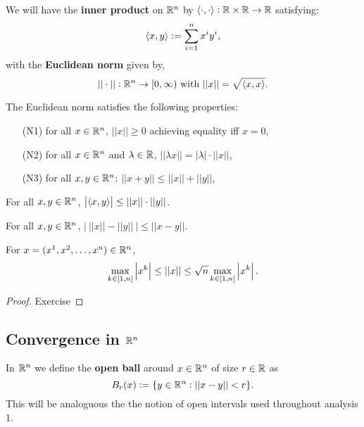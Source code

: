 \documentclass[../Year2.tex]{subfiles}
\begin{document}
\begin{definition}
    We will have the \textbf{inner product} on $\mathbb{R}^n$ by $\left\langle \cdot,\cdot \right\rangle:\mathbb{R}\times\mathbb{R}\rightarrow\mathbb{R}$ satisfying: 
    \[
        \left\langle x,y \right\rangle := \sum_{i=1}^n x^i y^i \text{\textcolor{black}{,}}
    \] with the \textbf{Euclidean norm} given by, \[
        ||\cdot||:\RR^n\rightarrow[0,\infty) \ \black{with } ||x||=\sqrt{\abr{x,x}}\black{.}
    \]
\end{definition}

\vspace{-20pt}

\begin{proposition}
    The Euclidean norm satisfies the following properties: \begin{enumerate}
        \item[(N1)] for all $x\in\mathbb{R}^n$, $||x||\geq 0$ achieving equality iff $x=0$,
        \item[(N2)] for all $x\in\mathbb{R}^n$ and $\lambda\in\mathbb{R}$, $||\lambda x|| = |\lambda|\cdot||x||$,
        \item[(N3)] for all $x,y\in\mathbb{R}^n$: $||x+y||\leq||x||+||y||$,
    \end{enumerate}
\end{proposition}

\begin{theorem}
    For all $x,y\in\mathbb{R}^n$, $\left|\left\langle x,y \right\rangle\right|\leq||x||\cdot||y||$.
\end{theorem}

\begin{theorem}
    For all $x,y\in\mathbb{R}^n$, $\big|\ ||x||-||y||\ \big|\leq||x-y||$.
\end{theorem}

\begin{proposition}
    For $x=(x^1,x^2,\ldots,x^n)\in\mathbb{R}^n$,\[
        \max_{k\in[1,n]}\left|x^k\right|\leq||x||\leq\sqrt{n}\max_{k\in[1,n]}\left|x^k\right|\text{\textcolor{black}{.}}
    \]
    \vspace{-20pt}
    \begin{proof}
        Exercise
    \end{proof}
\end{proposition}

\subsection{Convergence in \texorpdfstring{$\mathbb{R}^n$}{Rn}}

\begin{definition}
    In $\mathbb{R}^n$ we define the \textbf{open ball} around $x\in\mathbb{R}^n$ of size $r\in\mathbb{R}$ as \[
        B_r(x):=\{y\in\mathbb{R}^n:||x-y||<r\}\text{\textcolor{black}{.}}
    \] This will be analoguous the the notion of open intervals used throughout analysis 1.
\end{definition}
\end{document}
